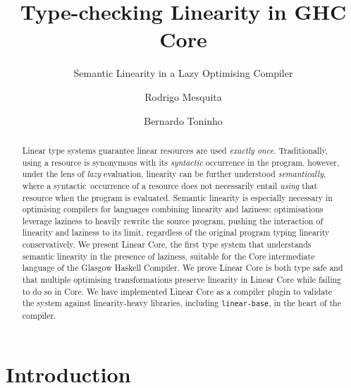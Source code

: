 \documentclass[acmsmall,review]{acmart}
\title{Type-checking Linearity in GHC Core}
\subtitle{Semantic Linearity in a Lazy Optimising Compiler}
\author{Rodrigo Mesquita}
\affiliation{
  \department{Departamento de Inform\'{a}tica}
  \institution{FCT-NOVA, Universidade Nova de Lisboa}
  \country{Portugal}}
\affiliation{
   \institution{Well-Typed}
   \country{Something}}
\author{Bernardo Toninho}
\affiliation{
  \department{Departamento de Inform\'{a}tica}
  \institution{NOVA-LINCS, FCT-NOVA, Universidade Nova de Lisboa}
  \country{Portugal}}
\begin{document}
\begin{abstract}
Linear type systems guarantee linear resources are used \emph{exactly once}.
Traditionally, using a resource is synonymous with its \emph{syntactic}
occurrence in the program, however, under the lens of \emph{lazy} evaluation,
linearity can be further understood \emph{semantically}, where a
syntactic occurrence of a resource does not necessarily entail
\emph{using} that resource when the program is evaluated.
%
Semantic linearity is especially necessary in optimising compilers for
languages combining linearity and laziness: optimisations leverage laziness to
heavily rewrite the source program, pushing the interaction of linearity and
laziness to its limit, regardless of the original program typing linearity
conservatively.
%
We present Linear Core, the first type system that understands semantic
linearity in the presence of laziness, suitable for the Core intermediate
language of the Glasgow Haskell Compiler. We prove Linear Core is both type
safe and that multiple optimising transformations preserve linearity in Linear
Core while failing to do so in Core. We have implemented Linear Core as a
compiler plugin to validate the system against linearity-heavy libraries,
including \texttt{linear-base}, in the heart of the compiler.
\end{abstract}

\maketitle

\section{Introduction}

\end{document}
